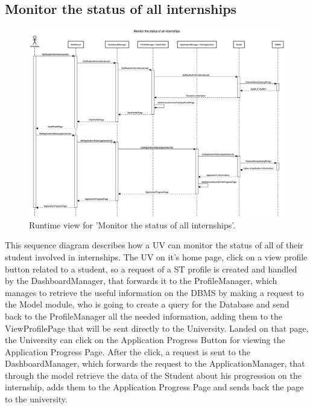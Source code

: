 \subsection{Monitor the status of all internships}
\begin{figure}[H]
    \begin{center}
        \includegraphics[width=0.8\linewidth]{DD/LaTeX/Images/RuntimeView/MonitorStatusOfAllInternships.png}
        \caption{Runtime view for 'Monitor the status of all internships'.}
        \label{fig:runtime_MonitorStatusOfAllInternships}%
    \end{center}
\end{figure}

This sequence diagram describes how a UV can monitor the status of all of their student involved in internships. The UV on it’s home page, click on a view profile button related to a student, so a request of a ST profile is created and handled by the DashboardManager, that forwards it to the ProfileManager, which manages to retrieve the useful information on the DBMS by making a request to the Model module, who is going to create a query for the Database and send back to the ProfileManager all the needed information, adding them to the ViewProfilePage that will be sent directly to the University. Landed on that page, the University can click on the Application Progress Button for viewing the Application Progress Page. After the click, a request is sent to the DashboardManager, which forwards the request to the ApplicationManager, that through the model retrieve the data of the Student about his progression on the internship, adds them to the Application Progress Page and sends back the page to the university.



